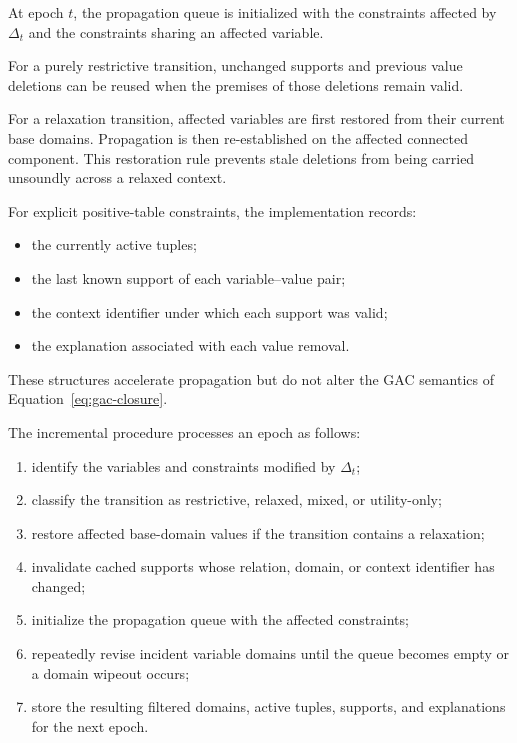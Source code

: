\documentclass[pdflatex,sn-mathphys-num,iicol,oneside]{sn-jnl}
\begin{document}
At epoch $t$, the propagation queue is initialized with the
constraints affected by $\Delta_t$ and the constraints sharing an
affected variable.

For a purely restrictive transition, unchanged supports and previous
value deletions can be reused when the premises of those deletions
remain valid.

For a relaxation transition, affected variables are first restored
from their current base domains. Propagation is then re-established
on the affected connected component. This restoration rule prevents
stale deletions from being carried unsoundly across a relaxed context.

For explicit positive-table constraints, the implementation records:

\begin{itemize}
    \item the currently active tuples;
    \item the last known support of each variable--value pair;
    \item the context identifier under which each support was valid;
    \item the explanation associated with each value removal.
\end{itemize}

These structures accelerate propagation but do not alter the GAC
semantics of Equation~\eqref{eq:gac-closure}.

The incremental procedure processes an epoch as follows:

\begin{enumerate}
    \item identify the variables and constraints modified by
    $\Delta_t$;

    \item classify the transition as restrictive, relaxed, mixed, or
    utility-only;

    \item restore affected base-domain values if the transition
    contains a relaxation;

    \item invalidate cached supports whose relation, domain, or
    context identifier has changed;

    \item initialize the propagation queue with the affected
    constraints;

    \item repeatedly revise incident variable domains until the queue
    becomes empty or a domain wipeout occurs;

    \item store the resulting filtered domains, active tuples,
    supports, and explanations for the next epoch.
\end{enumerate}
\end{document}
